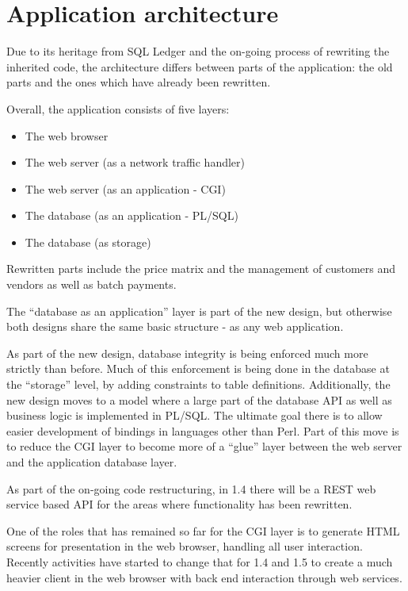 \section{Application architecture}
\label{sec-ledgersmb-architecture}

Due to its heritage from SQL Ledger and the on-going process of rewriting
the inherited code, the architecture differs between parts
of the application: the old parts and the ones which have already been
rewritten.

Overall, the application consists of five layers:

\begin{itemize}
\item The web browser
\item The web server (as a network traffic handler)
\item The web server (as an application - CGI)
\item The database (as an application - PL/SQL)
\item The database (as storage)
\end{itemize}

Rewritten parts include the price matrix and the management of customers
and vendors as well as batch payments.

The ``database as an application'' layer is part of the new design, but otherwise
both designs share the same basic structure - as any web application.

As part of the new design, database integrity is being enforced much more
strictly than before.  Much of this enforcement is being done in the database
at the ``storage'' level, by adding constraints to table definitions. Additionally,
the new design moves to a model where a large part of the database API as well
as business logic is implemented in PL/SQL.  The ultimate goal there is to
allow easier development of bindings in languages other than Perl.  Part of this
move is to reduce the CGI layer to become more of a ``glue'' layer between
the web server and the application database layer.

As part of the on-going code restructuring, in 1.4 there will be a REST web service
based API for the areas where functionality has been rewritten.

One of the roles that has remained so far for the CGI layer is to generate
HTML screens for presentation in the web browser, handling all user interaction.
Recently activities have started to change that for 1.4 and 1.5 to create a
much heavier client in the web browser with back end interaction through
web services.

